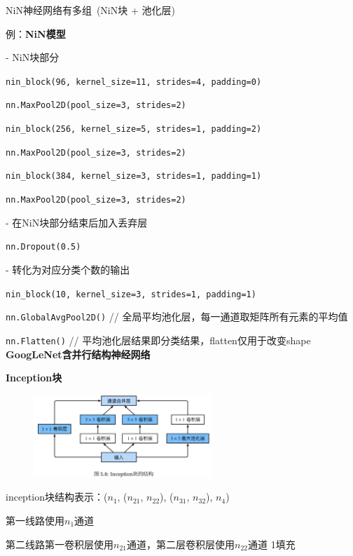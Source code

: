 \documentclass[UTF8]{ctexart}
\begin{document}
  NiN神经网络有多组\ (NiN块 + 池化层)
  
  例：\textbf{NiN模型}

  \quad - NiN块部分

  \quad \texttt{nin\_block(96, kernel\_size=11, strides=4, padding=0)}

  \quad \texttt{nn.MaxPool2D(pool\_size=3, strides=2)}

  \quad \texttt{nin\_block(256, kernel\_size=5, strides=1, padding=2)}

  \quad \texttt{nn.MaxPool2D(pool\_size=3, strides=2)}

  \quad \texttt{nin\_block(384, kernel\_size=3, strides=1, padding=1)}

  \quad \texttt{nn.MaxPool2D(pool\_size=3, strides=2)}

  \quad - 在NiN块部分结束后加入丢弃层

  \quad \texttt{nn.Dropout(0.5)}

  \quad - 转化为对应分类个数的输出

  \quad \texttt{nin\_block(10, kernel\_size=3, strides=1, padding=1)}

  \quad \texttt{nn.GlobalAvgPool2D()} // 全局平均池化层，每一通道取矩阵所有元素的平均值

  \quad \texttt{nn.Flatten()} // 平均池化层结果即分类结果，flatten仅用于改变shape\\
\textbf{GoogLeNet含并行结构神经网络}

  \textbf{Inception块}
  \begin{figure}[H] %
    \centering %
    \includegraphics[width=0.6\textwidth]{note_images/inception_block.png} %
  \end{figure}

  \quad inception块结构表示：($n_1$, ($n_{21}$, $n_{22}$), ($n_{31}$, $n_{32}$), $n_4$) 
  
  \quad \quad 第一线路使用$n_1$通道
 
  \quad \quad 第二线路第一卷积层使用$n_{21}$通道，第二层卷积层使用$n_{22}$通道 1填充
 
\end{document}

